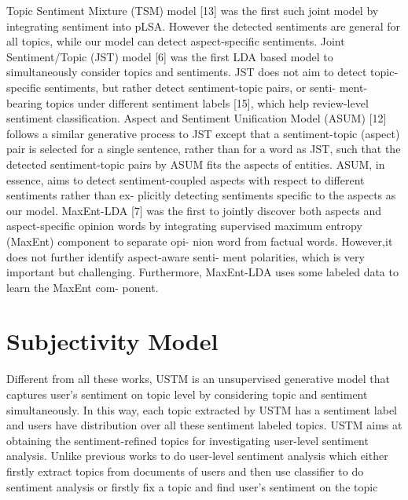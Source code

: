 \documentclass[runningheads,a4paper]{llncs}
\begin{document}
{Topic Sentiment Mixture (TSM) model [13] was the first such joint model by integrating sentiment into pLSA. However the detected sentiments are general for all topics, while our model can detect aspect-specific sentiments. Joint Sentiment/Topic (JST) model [6] was the first LDA based model to simultaneously consider topics and sentiments. JST does not aim to detect topic-specific sentiments, but rather detect sentiment-topic pairs, or senti- ment-bearing topics under different sentiment labels [15], which help review-level sentiment classification. Aspect and Sentiment Unification Model (ASUM) [12] follows a similar generative process to JST except that a sentiment-topic (aspect) pair is selected for a single sentence, rather than for a word as JST, such that the detected sentiment-topic pairs by ASUM fits the aspects of entities. ASUM, in essence, aims to detect sentiment-coupled aspects with respect to different sentiments rather than ex- plicitly detecting sentiments specific to the aspects as our model. MaxEnt-LDA [7] was the first to jointly discover both aspects and aspect-specific opinion words by integrating supervised maximum entropy (MaxEnt) component to separate opi- nion word from factual words. However,it does not further identify aspect-aware senti- ment polarities, which is very important but challenging. Furthermore, MaxEnt-LDA uses some labeled data to learn the MaxEnt com- ponent.

\section{Subjectivity Model}
Different from all these works, USTM is an unsupervised generative model that captures user’s sentiment on topic level by considering topic and sentiment simultaneously. In this way, each topic extracted by USTM has a sentiment label and users have distribution over all these sentiment labeled topics. USTM aims at obtaining the sentiment-refined topics for investigating user-level sentiment analysis. Unlike previous works to do user-level sentiment analysis which either firstly extract topics from documents of users and then use classifier to do sentiment analysis or firstly fix a topic and find user’s sentiment on the topic\cite{tan2011user}

}
\end{document}
